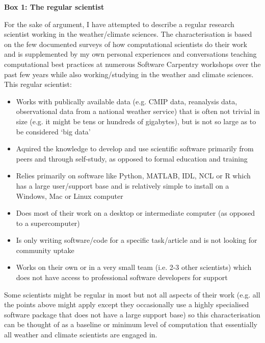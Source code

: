 \textbf{Box 1: The regular scientist}

For the sake of argument, I have attempted to describe a regular research scientist working in the weather/climate sciences. The characterisation is based on the few documented surveys of how computational scientists do their work \citep{Hannay2009,Stodden2010} and is supplemented by my own personal experiences and conversations teaching computational best practices at numerous Software Carpentry workshops over the past few years while also working/studying in the weather and climate sciences. This regular scientist:
\begin{itemize}
\item Works with publically available data (e.g. CMIP data, reanalysis data, observational data from a national weather service) that is often not trivial in size (e.g. it might be tens or hundreds of gigabytes), but is not so large as to be considered `big data' 
\item Aquired the knowledge to develop and use scientific software primarily from peers and through self-study, as opposed to formal education and training
\item Relies primarily on software like Python, MATLAB, IDL, NCL or R which has a large user/support base and is relatively simple to install on a Windows, Mac or Linux computer
\item Does most of their work on a desktop or intermediate computer (as opposed to a supercomputer)
\item Is only writing software/code for a specific task/article and is not looking for community uptake \citep{Easterbrook2014} 
\item Works on their own or in a very small team (i.e. 2-3 other scientists) which does not have access to professional software developers for support
\end{itemize}

Some scientists might be regular in most but not all aspects of their work (e.g. all the points above might apply except they occasionally use a highly specialised software package that does not have a large support base) so this characterisation can be thought of as a baseline or minimum level of computation that essentially all weather and climate scientists are engaged in.  







